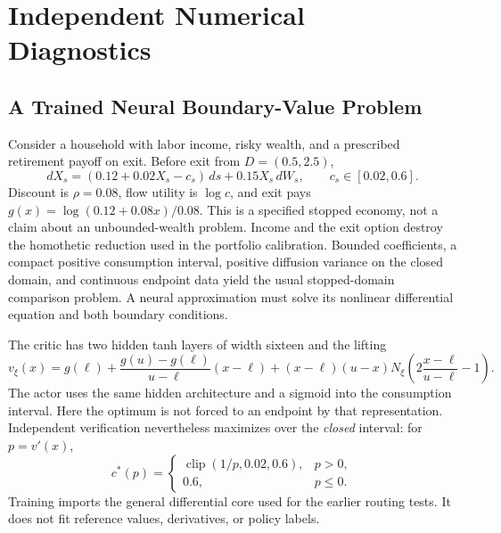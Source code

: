 \section{Independent Numerical Diagnostics}\label{app:r15diagnostics}
\subsection{A Trained Neural Boundary-Value Problem}\label{sec:nonquadratic}
Consider a household with labor income, risky wealth, and a prescribed retirement payoff on exit. Before exit from $D=(0.5,2.5)$,
\begin{equation}\label{eq:stopped-consumption-r6}
 dX_s=(0.12+0.02X_s-c_s)\,ds+0.15X_s\,dW_s,
 \qquad c_s\in[0.02,0.6].
\end{equation}
Discount is $\rho=0.08$, flow utility is $\log c$, and exit pays $g(x)=\log(0.12+0.08x)/0.08$. This is a specified stopped economy, not a claim about an unbounded-wealth problem. Income and the exit option destroy the homothetic reduction used in the portfolio calibration. Bounded coefficients, a compact positive consumption interval, positive diffusion variance on the closed domain, and continuous endpoint data yield the usual stopped-domain comparison problem. A neural approximation must solve its nonlinear differential equation and both boundary conditions.

The critic has two hidden tanh layers of width sixteen and the lifting
\[
 v_\xi(x)=g(\ell)+\frac{g(u)-g(\ell)}{u-\ell}(x-\ell)
 +(x-\ell)(u-x)N_\xi\!\left(2\frac{x-\ell}{u-\ell}-1\right).
\]
The actor uses the same hidden architecture and a sigmoid into the consumption interval. Here the optimum is not forced to an endpoint by that representation. Independent verification nevertheless maximizes over the \emph{closed} interval: for $p=v'(x)$,
\begin{equation}\label{eq:exact-action-r6}
 c^*(p)=\begin{cases}\operatorname{clip}(1/p,0.02,0.6),&p>0,\\0.6,&p\leq0.\end{cases}
\end{equation}
Training imports the general differential core used for the earlier routing tests. It does not fit reference values, derivatives, or policy labels.

